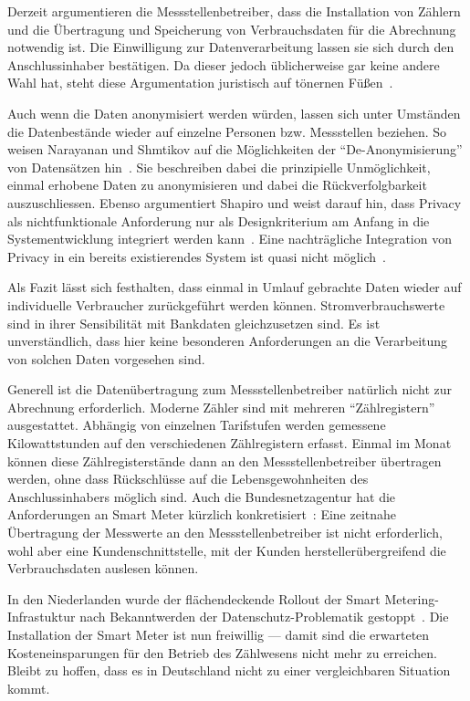 \documentclass[logo]{fhgart}
\begin{document}
Derzeit argumentieren die Messstellenbetreiber, dass die Installation
von Zählern und die Übertragung und Speicherung von Verbrauchsdaten für
die Abrechnung notwendig ist. Die Einwilligung zur Datenverarbeitung
lassen sie sich durch den Anschlussinhaber bestätigen. Da dieser jedoch
üblicherweise gar keine andere Wahl hat, steht diese Argumentation
juristisch auf tönernen Füßen~\cite{karg10rahmenbedingungen}. 

Auch wenn die Daten anonymisiert werden würden, lassen sich unter
Umständen die Datenbestände wieder auf einzelne Personen bzw.
Messstellen beziehen. So weisen Narayanan und Shmtikov auf die Möglichkeiten der
``De-Anonymisierung'' von Datensätzen hin~\cite{narayanan2010pii}. Sie
beschreiben dabei die prinzipielle Unmöglichkeit, einmal erhobene Daten
zu anonymisieren und dabei die Rückverfolgbarkeit auszuschliessen.
Ebenso argumentiert Shapiro und weist darauf hin, dass Privacy als
nichtfunktionale Anforderung nur als Designkriterium am Anfang in die
Systementwicklung integriert werden kann~\cite{shapiro2010privacy}. Eine
nachträgliche Integration von Privacy in ein bereits existierendes
System ist quasi nicht möglich~\cite{cavoukian2010smartprivacy}.

Als Fazit lässt sich festhalten, dass einmal in Umlauf gebrachte Daten
wieder auf individuelle Verbraucher zurückgeführt werden können.
Stromverbrauchswerte sind in ihrer Sensibilität mit Bankdaten
gleichzusetzen sind. Es ist unverständlich, dass hier keine besonderen
Anforderungen an die Verarbeitung von solchen Daten vorgesehen sind.

Generell ist die Datenübertragung zum Messstellenbetreiber natürlich
nicht zur Abrechnung erforderlich. Moderne Zähler sind mit mehreren
"`Zählregistern"' ausgestattet. Abhängig von einzelnen Tarifstufen
werden gemessene Kilowattstunden auf den verschiedenen Zählregistern
erfasst. Einmal im Monat können diese Zählregisterstände dann an den
Messstellenbetreiber übertragen werden, ohne dass Rückschlüsse auf die
Lebensgewohnheiten des Anschlussinhabers möglich sind. Auch die
Bundesnetzagentur hat die Anforderungen an Smart Meter kürzlich
konkretisiert~\cite{bundesnetzagentur10position}: Eine zeitnahe Übertragung der Messwerte an den
Messstellenbetreiber ist nicht erforderlich, wohl aber eine
Kundenschnittstelle, mit der Kunden herstellerübergreifend die
Verbrauchsdaten auslesen können.

In den Niederlanden wurde der flächendeckende
Rollout der Smart Metering-Infrastuktur nach Bekanntwerden der
Datenschutz-Problematik gestoppt~\cite{nrc09compulsory}. Die
Installation der Smart Meter ist nun freiwillig --- damit sind die
erwarteten Kosteneinsparungen für den Betrieb des Zählwesens nicht mehr
zu erreichen.  Bleibt zu hoffen, dass es in Deutschland nicht zu einer
vergleichbaren Situation kommt.
\end{document}

